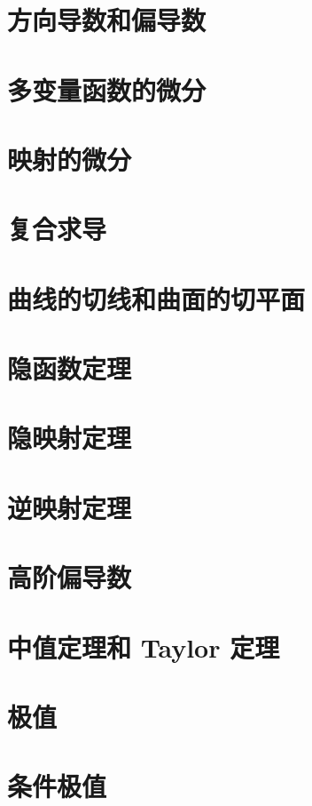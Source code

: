 \documentclass[a4paper, 12pt]{ctexbook}
\begin{document}
        \section{方向导数和偏导数}
        \section{多变量函数的微分}
        \section{映射的微分}
        \section{复合求导}
        \section{曲线的切线和曲面的切平面}
        \section{隐函数定理}
        \section{隐映射定理}
        \section{逆映射定理}
        \section{高阶偏导数}
        \section{中值定理和 Taylor 定理}
        \section{极值}
        \section{条件极值}
\end{document}
